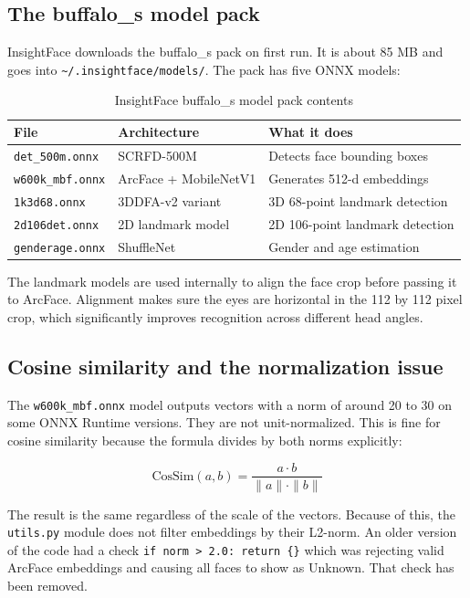 \documentclass[12pt,a4paper]{report}
\begin{document}
\subsection{The buffalo\_s model pack}

InsightFace downloads the buffalo\_s pack on first run. It is about 85 MB and goes into \texttt{\textasciitilde/.insightface/models/}. The pack has five ONNX models:

\begin{table}[htbp]
\centering
\begin{tabular}{|l|l|l|}
\hline
\textbf{File} & \textbf{Architecture} & \textbf{What it does} \\
\hline
\texttt{det\_500m.onnx}  & SCRFD-500M            & Detects face bounding boxes \\
\texttt{w600k\_mbf.onnx} & ArcFace + MobileNetV1 & Generates 512-d embeddings \\
\texttt{1k3d68.onnx}     & 3DDFA-v2 variant      & 3D 68-point landmark detection \\
\texttt{2d106det.onnx}   & 2D landmark model     & 2D 106-point landmark detection \\
\texttt{genderage.onnx}  & ShuffleNet            & Gender and age estimation \\
\hline
\end{tabular}
\caption{InsightFace buffalo\_s model pack contents}
\label{tab:insightface_models}
\end{table}

The landmark models are used internally to align the face crop before passing it to ArcFace. Alignment makes sure the eyes are horizontal in the 112 by 112 pixel crop, which significantly improves recognition across different head angles.

\subsection{Cosine similarity and the normalization issue}

The \texttt{w600k\_mbf.onnx} model outputs vectors with a norm of around 20 to 30 on some ONNX Runtime versions. They are not unit-normalized. This is fine for cosine similarity because the formula divides by both norms explicitly:

\[
\text{CosSim}(a, b) = \frac{a \cdot b}{\|a\| \cdot \|b\|}
\]

The result is the same regardless of the scale of the vectors. Because of this, the \texttt{utils.py} module does not filter embeddings by their L2-norm. An older version of the code had a check \texttt{if norm > 2.0: return \{\}} which was rejecting valid ArcFace embeddings and causing all faces to show as Unknown. That check has been removed.
\end{document}
